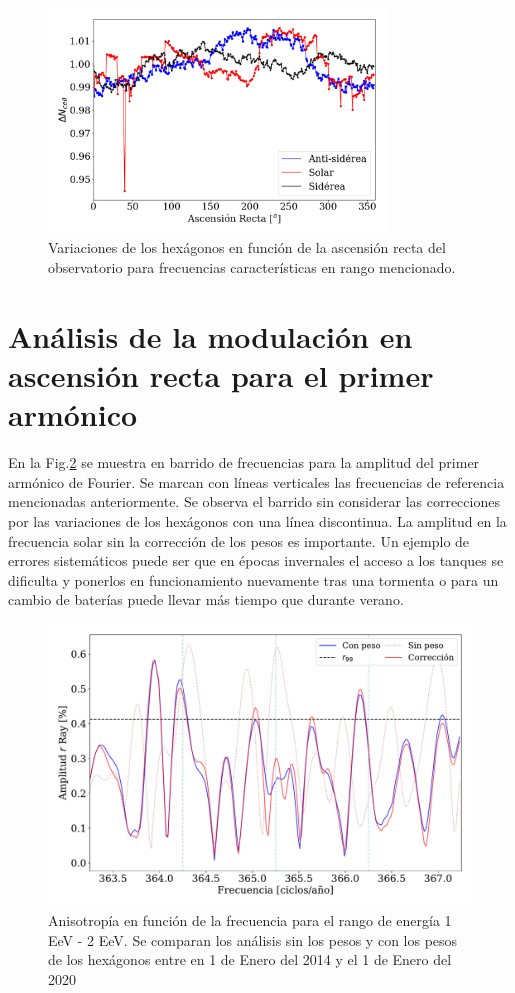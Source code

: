 			\begin{figure}[H]
				\centering
				\includegraphics[width=0.8\textwidth]{weights_2013_2020.png}
				\caption{Variaciones de los hexágonos en función de la ascensión recta del observatorio para frecuencias características en rango mencionado. }
				\label{pesos_bin_1_2}
			\end{figure}


\section{Análisis de la modulación en ascensión recta para el primer armónico}

En la Fig.\ref{anisotropia_rayleigh} se muestra en barrido de frecuencias para la amplitud del primer armónico de Fourier. Se marcan con líneas verticales las frecuencias de referencia mencionadas anteriormente. Se observa el barrido sin considerar las correcciones por las variaciones de los hexágonos con una línea discontinua. La  amplitud  en la frecuencia solar sin la corrección de los pesos es importante. Un ejemplo de errores sistemáticos puede ser que en épocas invernales el acceso a los tanques se dificulta y ponerlos en funcionamiento nuevamente tras una tormenta o para un cambio de baterías puede llevar más tiempo que durante verano. 

		\begin{figure}[H]
			\centering
			\includegraphics[width=0.75\linewidth]{pesos_sin_con_1_2_EeV.pdf}
			\caption{Anisotropía en función de la frecuencia para el rango de energía 1  EeV - 2 EeV. Se comparan los análisis sin los pesos y con los pesos de los hexágonos entre en 1 de Enero del 2014 y el 1 de Enero del 2020}
			\label{anisotropia_rayleigh}
		\end{figure}

